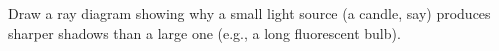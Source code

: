 Draw a ray diagram showing why a small light source (a
candle, say) produces sharper shadows than a large one (e.g.,
a long fluorescent bulb).
